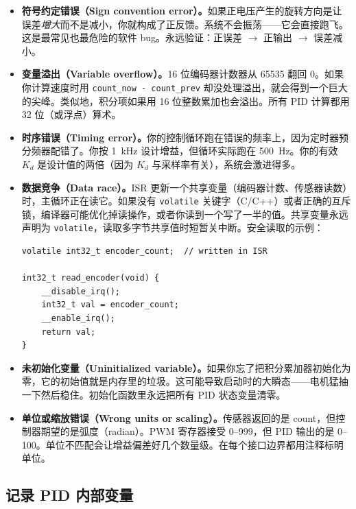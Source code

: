 \begin{itemize}
    \item \textbf{符号约定错误（Sign convention error）。}如果正电压产生的旋转方向是让误差\textit{增大}而不是减小，你就构成了正反馈。系统不会振荡——它会直接跑飞。这是最常见也最危险的软件 bug。永远验证：正误差 $\to$ 正输出 $\to$ 误差减小。

    \item \textbf{变量溢出（Variable overflow）。}16 位编码器计数器从 65535 翻回 0。如果你计算速度时用 \texttt{count\_now - count\_prev} 却没处理溢出，就会得到一个巨大的尖峰。类似地，积分项如果用 16 位整数累加也会溢出。所有 PID 计算都用 32 位（或浮点）算术。

    \item \textbf{时序错误（Timing error）。}你的控制循环跑在错误的频率上，因为定时器预分频器配错了。你按 1~kHz 设计增益，但循环实际跑在 500~Hz。你的有效 $K_d$ 是设计值的两倍（因为 $K_d$ 与采样率有关），系统会激进得多。

    \item \textbf{数据竞争（Data race）。}ISR 更新一个共享变量（编码器计数、传感器读数）时，主循环正在读它。如果没有 \texttt{volatile} 关键字（C/C++）或者正确的互斥锁，编译器可能优化掉读操作，或者你读到一个写了一半的值。共享变量永远声明为 \texttt{volatile}，读取多字节共享值时短暂关中断。安全读取的示例：

\begin{verbatim}
volatile int32_t encoder_count;  // written in ISR

int32_t read_encoder(void) {
    __disable_irq();
    int32_t val = encoder_count;
    __enable_irq();
    return val;
}
\end{verbatim}

    \item \textbf{未初始化变量（Uninitialized variable）。}如果你忘了把积分累加器初始化为零，它的初始值就是内存里的垃圾。这可能导致启动时的大瞬态——电机猛抽一下然后稳住。初始化函数里永远把所有 PID 状态变量清零。

    \item \textbf{单位或缩放错误（Wrong units or scaling）。}传感器返回的是 count，但控制器期望的是弧度（radian）。PWM 寄存器接受 0--999，但 PID 输出的是 0--100。单位不匹配会让增益偏差好几个数量级。在每个接口边界都用注释标明单位。
\end{itemize}

\subsection{记录 PID 内部变量}

